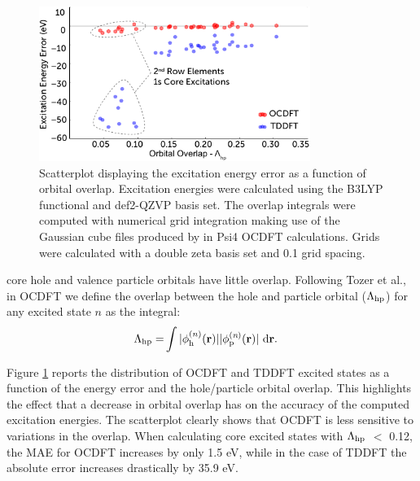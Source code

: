 \documentclass[12pt]{article}
\begin{document}
\begin{figure}[!t]
\centering
\includegraphics[width=8.8cm]{scatterNEWER3.pdf}
\caption{Scatterplot displaying the excitation energy error as a function of orbital overlap. Excitation energies were calculated using the B3LYP functional and def2-QZVP basis set. The overlap integrals were computed with numerical grid integration making use of the Gaussian cube files produced by in Psi4 OCDFT calculations. Grids were calculated with a double zeta basis set and 0.1 grid spacing.}
\label{figure:scatter}
\end{figure}
core hole and valence particle orbitals have little overlap. Following Tozer et al.,\cite{peach_excitation_2008} in OCDFT we define the overlap between the hole and particle orbital ($\Lambda_{\rm hp}$) for any excited state $n$ as the integral:
\begin{align}
\Lambda_{\rm hp} = &\int |\phi^{(n)}_{\rm h} (\bf{r})||\phi^{(\textit{n})}_{\rm p} (\bf{r})| \ \rm d\bf{r}  .
\end{align}

Figure \ref{figure:scatter} reports the distribution of OCDFT and TDDFT excited states as a function of the energy error and the hole/particle orbital overlap. This highlights the effect that a decrease in orbital overlap has on the accuracy of the computed excitation energies. The scatterplot clearly shows that OCDFT is less sensitive to variations in the overlap. When calculating core excited states with $\Lambda_{\rm hp}$ $<$ 0.12, the MAE for OCDFT increases by only 1.5 eV, while in the case of TDDFT the absolute error increases drastically by 35.9 eV.
\end{document}
